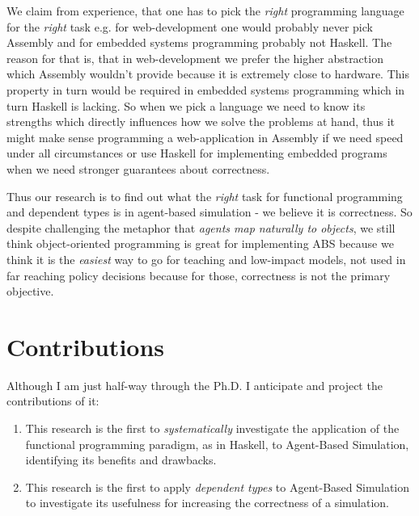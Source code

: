 We claim from experience, that one has to pick the \textit{right} programming language for the \textit{right} task e.g. for web-development one would probably never pick Assembly and for embedded systems programming probably not Haskell. The reason for that is, that in web-development we prefer the higher abstraction which Assembly wouldn't provide because it is extremely close to hardware. This property in turn would be required in embedded systems programming which in turn Haskell is lacking. So when we pick a language we need to know its strengths which directly influences how we solve the problems at hand, thus it might make sense programming a web-application in Assembly if we need speed under all circumstances or use Haskell for implementing embedded programs when we need stronger guarantees about correctness.

Thus our research is to find out what the \textit{right} task for functional programming and dependent types is in agent-based simulation - we believe it is correctness. So despite challenging the metaphor that \textit{agents map naturally to objects}, we still think object-oriented programming is great for implementing ABS because we think it is the \textit{easiest} way to go for teaching and low-impact models, not used in far reaching policy decisions because for those, correctness is not the primary objective.

\section{Contributions}
Although I am just half-way through the Ph.D. I anticipate and project the contributions of it:

\begin{enumerate}
	\item This research is the first to \textit{systematically} investigate the application of the functional programming paradigm, as in Haskell, to Agent-Based Simulation, identifying its benefits and drawbacks.
	\item This research is the first to apply \textit{dependent types} to Agent-Based Simulation to investigate its usefulness for increasing the correctness of a simulation.
\end{enumerate}